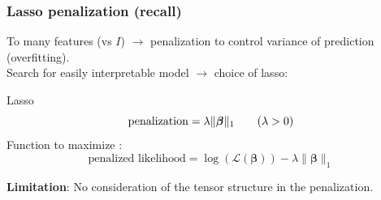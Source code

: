\documentclass{beamer}
\begin{document}
\begin{frame}
    \frametitle{Lasso penalization (recall)}
    To many features (vs $I$) $\rightarrow$ penalization to control variance of prediction (overfitting).\\[10 pt]
    Search for easily interpretable model $\rightarrow$ choice of lasso: 
    \begin{block}{Lasso}
    $$\text{penalization} = \lambda \lVert \bm{\beta} \rVert_1 \hspace{0.7 cm} (\lambda >0)$$
    Function to maximize : 
    $$ \text{penalized likelihood} =  \log(\mathcal{L}(\bm{\beta})) - \lambda \lVert \bm{\beta} \rVert_1 $$
    \end{block}
\vspace{5 pt}
    \textbf{Limitation}: No consideration of the tensor structure in the penalization.

    
\end{frame}






\end{document}
